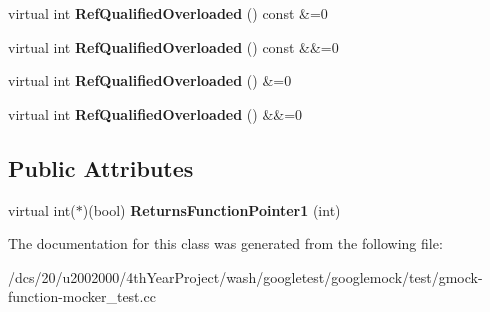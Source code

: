 \begin{DoxyCompactItemize}
virtual int {\bfseries Ref\+Qualified\+Overloaded} () const \&=0
\item 
\mbox{\label{classtesting_1_1gmock__function__mocker__test_1_1FooInterface_adc4c965116f6ee2b1f57abfbe95aaa2f}} 
virtual int {\bfseries Ref\+Qualified\+Overloaded} () const \&\&=0
\item 
\mbox{\label{classtesting_1_1gmock__function__mocker__test_1_1FooInterface_a75ffd8cf08541392ae272de1580c48ca}} 
virtual int {\bfseries Ref\+Qualified\+Overloaded} () \&=0
\item 
\mbox{\label{classtesting_1_1gmock__function__mocker__test_1_1FooInterface_a60ea15ae778c97867cecb71bdd4f750d}} 
virtual int {\bfseries Ref\+Qualified\+Overloaded} () \&\&=0
\end{DoxyCompactItemize}
\subsection*{Public Attributes}
\begin{DoxyCompactItemize}
\item 
\mbox{\label{classtesting_1_1gmock__function__mocker__test_1_1FooInterface_a855bdcea5e7f0b17ee050da4969c8027}} 
virtual int($\ast$)(bool) {\bfseries Returns\+Function\+Pointer1} (int)
\end{DoxyCompactItemize}


The documentation for this class was generated from the following file\+:\begin{DoxyCompactItemize}
\item 
/dcs/20/u2002000/4th\+Year\+Project/wash/googletest/googlemock/test/gmock-\/function-\/mocker\+\_\+test.\+cc\end{DoxyCompactItemize}

